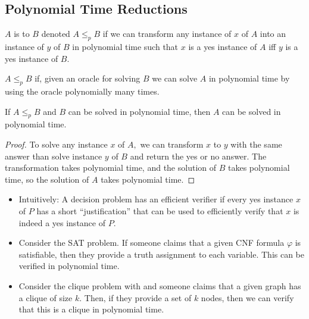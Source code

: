\documentclass[a4paper,12pt]{article}
\begin{document}
\subsection{Polynomial Time Reductions}
\begin{definition}[(Karp)]
    $A$ is  to $B$ denoted $A\leq_pB$ if we can transform any instance of $x$ of $A$ into an instance of $y$ of $B$ in polynomial time such that $x$ is a yes instance of $A$ iff $y$ is a yes instance of $B.$
\end{definition}
\begin{definition}[(Cook)]
    $A\leq_pB$ if, given an oracle for solving $B$ we can solve $A$ in polynomial time by using the oracle polynomially many times.
\end{definition}
\begin{theorem}
    If $A\leq_pB$ and $B$ can be solved in polynomial time, then $A$ can be solved in polynomial time.\begin{proof}
        To solve any instance $x$ of $A,$ we can transform $x$ to $y$ with the same answer than solve instance $y$ of $B$ and return the yes or no answer. The transformation takes polynomial time, and the solution of $B$ takes polynomial time, so the solution of $A$ takes polynomial time.
    \end{proof}
\end{theorem}
\begin{itemize}
    \item Intuitively: A decision problem has an efficient verifier if every yes instance $x$ of $P$ has a short ``justification'' that can be used to efficiently verify that $x$ is indeed a yes instance of $P.$
    \item Consider the SAT problem. If someone claims that a given CNF formula $\varphi$ is satisfiable, then they provide a truth assignment to each variable. This can be verified in polynomial time.
    \item Consider the clique problem with and someone claims that a given graph has a clique of size $k.$ Then, if they provide a set of $k$ nodes, then we can verify that this is a clique in polynomial time.
\end{itemize}
\end{document}
